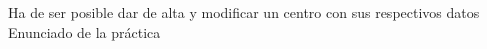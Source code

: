 {\reportauthors}
{Ha de ser posible dar de alta y modificar un centro con sus respectivos datos}
{}
{Enunciado de la práctica}

